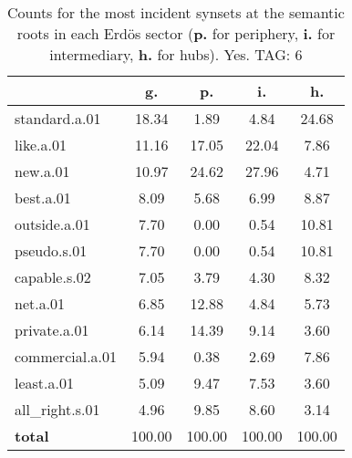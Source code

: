 \begin{table}[h!]
\begin{center}
\begin{tabular}{| l || c | c | c | c |}\hline
 & {\bf g.} & {\bf p.} & {\bf i.} & {\bf h.} \\\hline\hline
standard.a.01 & 18.34  & 1.89  & 4.84  & 24.68 \\\hline
like.a.01 & 11.16  & 17.05  & 22.04  & 7.86 \\\hline
new.a.01 & 10.97  & 24.62  & 27.96  & 4.71 \\\hline
best.a.01 & 8.09  & 5.68  & 6.99  & 8.87 \\\hline
outside.a.01 & 7.70  & 0.00  & 0.54  & 10.81 \\\hline
pseudo.s.01 & 7.70  & 0.00  & 0.54  & 10.81 \\\hline
capable.s.02 & 7.05  & 3.79  & 4.30  & 8.32 \\\hline
net.a.01 & 6.85  & 12.88  & 4.84  & 5.73 \\\hline
private.a.01 & 6.14  & 14.39  & 9.14  & 3.60 \\\hline
commercial.a.01 & 5.94  & 0.38  & 2.69  & 7.86 \\\hline
least.a.01 & 5.09  & 9.47  & 7.53  & 3.60 \\\hline
all\_right.s.01 & 4.96  & 9.85  & 8.60  & 3.14 \\\hline\hline
{{\bf total}} & 100.00  & 100.00  & 100.00  & 100.00 \\\hline
\end{tabular}
\caption{Counts for the most incident synsets at the semantic roots in each Erd\"os sector ({\bf p.} for periphery, {\bf i.} for intermediary, {\bf h.} for hubs). Yes. TAG: 6}
\end{center}
\end{table}